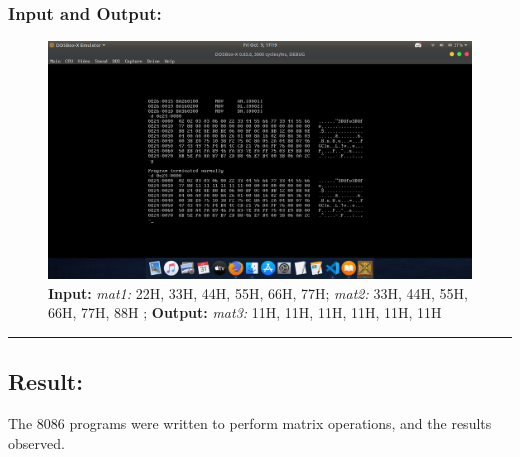 \documentclass[10pt,a4paper]{article}
\begin{document}
\begin{flushleft}
\subsubsection*{\textbf{Input and Output:}}
\begin{figure}[h]
    \centering
    \includegraphics[trim = 100mm 60mm 100mm 80mm, clip, width = \textwidth]{Pics/MSIO.png}
    \caption{ \textbf{Input:} \emph{mat1:} 22H, 33H, 44H, 55H, 66H, 77H; \emph{mat2:} 33H, 44H, 55H, 66H, 77H, 88H ; \newline \hspace{1cm}
              \textbf{Output:} \emph{mat3:} 11H, 11H, 11H, 11H, 11H, 11H}
\end{figure}
\hrule
\subsection*{\textbf{Result:}}
The 8086 programs were written to perform matrix operations, and the results observed.
\end{flushleft}
\end{document}
